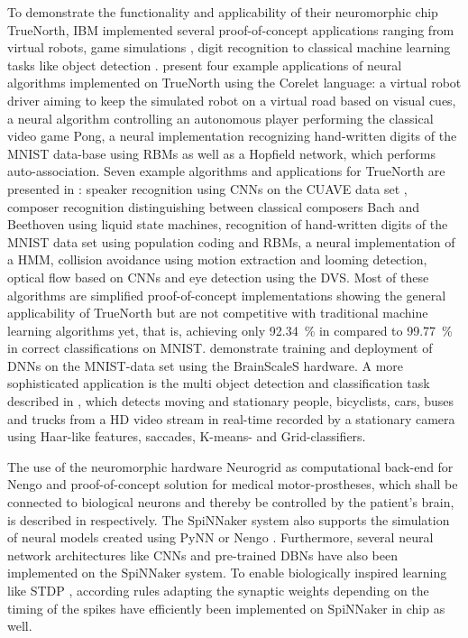 To demonstrate the functionality and applicability of their neuromorphic chip TrueNorth, IBM implemented several proof-of-concept applications ranging from virtual robots, game simulations \parencite{Arthur2012}, digit recognition \parencite{Arthur2012, Esser2013} to classical machine learning tasks like object detection \parencite{Akopyan2015}.
\textcite{Arthur2012} present four example applications of neural algorithms implemented on TrueNorth using the Corelet language: a virtual robot driver aiming to keep the simulated robot on a virtual road based on visual cues, a neural algorithm controlling an autonomous player performing the classical video game Pong, a neural implementation recognizing hand-written digits of the \ac{MNIST} data-base using \acp{RBM} as well as a Hopfield network, which performs auto-association.
Seven example algorithms and applications for TrueNorth are presented in \textcite{Esser2013}: speaker recognition using \acp{CNN} on the \ac{CUAVE} data set \parencite{Patterson2002}, composer recognition distinguishing between classical composers Bach and Beethoven using liquid state machines, recognition of hand-written digits of the \ac{MNIST} data set using population coding and \acp{RBM}, a neural implementation of a \ac{HMM}, collision avoidance using motion extraction and looming detection, optical flow based on \acp{CNN} and eye detection using the \ac{DVS}.
Most of these algorithms are simplified proof-of-concept implementations showing the general applicability of TrueNorth but are not competitive with traditional machine learning algorithms yet, that is, achieving only \SI{92.34}{\percent} in \textcite{Esser2013} compared to \SI{99.77}{\percent} in \textcite{Ciresan2012a} correct classifications on \ac{MNIST}.
\textcite{Schmitt2017} demonstrate training and deployment of \acp{DNN} on the \ac{MNIST}-data set using the \ac{BrainScaleS} hardware.
A more sophisticated application is the multi object detection and classification task described in \textcite{Akopyan2015}, which detects moving and stationary people, bicyclists, cars, buses and trucks from a HD video stream in real-time recorded by a stationary camera using Haar-like features, saccades, K-means- and Grid-classifiers.

The use of the neuromorphic hardware Neurogrid \parencite{Benjamin2014} as computational back-end for \ac{Nengo} and proof-of-concept solution for medical motor-prostheses, which shall be connected to biological neurons and thereby be controlled by the patient's brain, is described in \textcite{Choudhary2012, Dethier2011} respectively.
The \ac{SpiNNaker} system \parencite{Furber2014} also supports the simulation of neural models created using \ac{PyNN} or \ac{Nengo} \parencite{Mundy2015}.
Furthermore, several neural network architectures like \acp{CNN} \parencite{Serrano-Gotarredona2015} and pre-trained \acp{DBN} \parencite{Stromatias2015a, Stromatias2015} have also been implemented on the \ac{SpiNNaker} system.
To enable biologically inspired learning like \ac{STDP} \parencite{Bi2001}, according rules adapting the synaptic weights depending on the timing of the spikes have efficiently been implemented on \ac{SpiNNaker} in \textcite{Diehl2014} chip as well.

